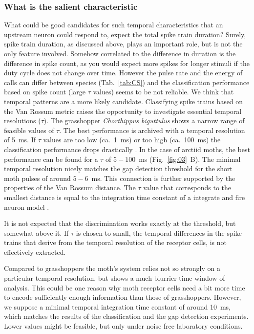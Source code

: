 \documentclass[12pt,a4paper,pdftex]{article}
\newcommand{\species}[1]{\textit{#1}}
\newcommand{\fig}[2]{(Fig.~#1~#2)}
\begin{document}
\subsubsection*{What is the salient characteristic}
What could be good candidates for such temporal characteristics that an upstream neuron could respond to, expect the total spike train duration? Surely, spike train duration, as discussed above, plays an important role, but is not the only feature involved. Somehow correlated to the difference in duration is the difference in spike count, as you would expect more spikes for longer stimuli if the duty cycle does not change over time. However the pulse rate and the energy of calls can differ between species (Tab.~\ref{tab:CS}) and the classification performance based on spike count (large $\tau$ values) seems to be not reliable. We think that temporal patterns are a more likely candidate. Classifying spike trains based on the Van Rossum metric raises the opportunity to investigate essential temporal resolutions ($\tau$). The grasshopper \species{Chorthippus biguttulus} shows a narrow range of feasible values of $\tau$. The best performance is archived with a temporal resolution of 5~ms. If $\tau$ values are too low (ca.~1~ms) or too high (ca.~100~ms) the classification performance drops drastically \cite{machens2003}. In the case of arctiid moths, the best performance can be found for a $\tau$ of $5-100$~ms \fig{\ref{fig:03}}{B}. The minimal temporal resolution nicely matches the gap detection threshold for the short moth pulses of around $5-6$~ms. This connection is further supported by the properties of the Van Rossum distance. The $ \tau $ value that corresponds to the smallest distance is equal to the integration time constant of a integrate and fire neuron model \cite{rossum2001}. 

It is not expected that the discrimination works exactly at the threshold, but somewhat above it. If $\tau$ is chosen to small, the temporal differences in the spike trains that derive from the temporal resolution of the receptor cells, is not effectively extracted.  

Compared to grasshoppers the moth's system relies not so strongly on a particular temporal resolution, but shows a much blurrier time window of analysis. This could be one reason why moth receptor cells need a bit more time to encode sufficiently enough information than those of grasshoppers.
However, we suppose a minimal temporal integration time constant of around 10~ms, which matches the results of the classification and the gap detection experiments. Lower values might be feasible, but only under noise free laboratory conditions.
\end{document}
